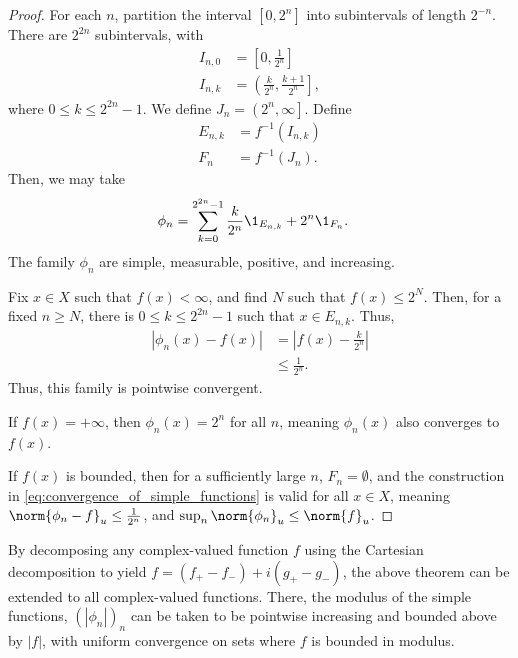 \documentclass[12pt]{mypackage}
\begin{document}
\begin{proof}
  For each $n$, partition the interval $\left[ 0,2^n \right]$ into subintervals of length $2^{-n}$. There are $2^{2n}$ subintervals, with
  \begin{align*}
    I_{n,0} &= \left[ 0,\frac{1}{2^{n}} \right]\\
    I_{n,k} &= \left(\frac{k}{2^{n}},\frac{k + 1}{2^{n}}\right],
  \end{align*}
  where $0 \leq k \leq 2^{2n}-1$. We define $J_n = \left( 2^{n},\infty \right]$. Define
  \begin{align*}
    E_{n,k} &= f^{-1}\left( I_{n,k} \right)\\
    F_n &= f^{-1}\left( J_n \right).
  \end{align*}
  Then, we may take
  \begin{align*}
    \phi_n &= \sum_{k=0}^{2^{2n}-1}\frac{k}{2^{n}}\1_{E_{n,k}} + 2^{n}\1_{F_n}.
  \end{align*}
  The family $\phi_n$ are simple, measurable, positive, and increasing.\newline

  Fix $x\in X$ such that $f(x) < \infty$, and find $N$ such that $f(x) \leq 2^{N}$. Then, for a fixed $n\geq N$, there is $0 \leq k \leq 2^{2n}-1$ such that $x\in E_{n,k}$. Thus,
  \begin{align*}
    \left\vert \phi_n(x) - f(x) \right\vert &= \left\vert f(x) - \frac{k}{2^{n}} \right\vert\label{eq:convergence_of_simple_functions}\tag{$\ast$}\\
                                            &\leq \frac{1}{2^{n}}.
  \end{align*}
  Thus, this family is pointwise convergent.\newline

  If $f(x) = +\infty$, then $\phi_n(x) = 2^{n}$ for all $n$, meaning $\phi_n(x)$ also converges to $f(x)$.\newline

  If $f(x)$ is bounded, then for a sufficiently large $n$, $F_n = \emptyset$, and the construction in \eqref{eq:convergence_of_simple_functions} is valid for all $x\in X$, meaning $\norm{\phi_n - f}_{u} \leq \frac{1}{2^{n}}$, and $\sup_{n}\norm{\phi_n}_{u} \leq \norm{f}_{u}$.
\end{proof}
\begin{remark}
  By decomposing any complex-valued function $f$ using the Cartesian decomposition to yield $f = \left( f_{+} - f_{-} \right) + i\left( g_{+} - g_{-} \right)$, the above theorem can be extended to all complex-valued functions. There, the modulus of the simple functions, $\left( \left\vert \phi_n \right\vert \right)_n$ can be taken to be pointwise increasing and bounded above by $\left\vert f \right\vert$, with uniform convergence on sets where $f$ is bounded in modulus.
\end{remark}
\end{document}
